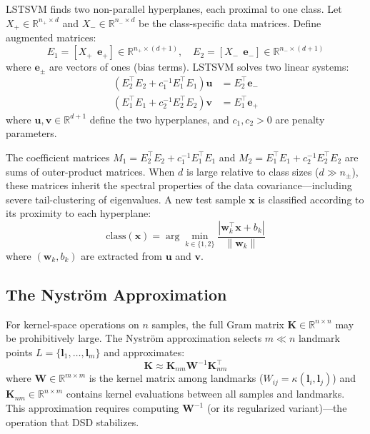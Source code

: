 \documentclass[journal]{IEEEtran}
\begin{document}
LSTSVM \cite{kumar2009lstsvm} finds two non-parallel hyperplanes, each proximal to one class. Let $X_+ \in \mathbb{R}^{n_+ \times d}$ and $X_- \in \mathbb{R}^{n_- \times d}$ be the class-specific data matrices. Define augmented matrices:
\begin{equation}
E_1 = [X_+ ~~ \bm{e}_+] \in \mathbb{R}^{n_+ \times (d+1)}, \quad E_2 = [X_- ~~ \bm{e}_-] \in \mathbb{R}^{n_- \times (d+1)}
\end{equation}
where $\bm{e}_\pm$ are vectors of ones (bias terms). LSTSVM solves two linear systems:
\begin{align}
(E_2^\top E_2 + c_1^{-1} E_1^\top E_1) \bm{u} &= E_2^\top \bm{e}_- \label{eq:lstsvm_u} \\
(E_1^\top E_1 + c_2^{-1} E_2^\top E_2) \bm{v} &= E_1^\top \bm{e}_+ \label{eq:lstsvm_v}
\end{align}
where $\bm{u}, \bm{v} \in \mathbb{R}^{d+1}$ define the two hyperplanes, and $c_1, c_2 > 0$ are penalty parameters.

The coefficient matrices $M_1 = E_2^\top E_2 + c_1^{-1} E_1^\top E_1$ and $M_2 = E_1^\top E_1 + c_2^{-1} E_2^\top E_2$ are sums of outer-product matrices. When $d$ is large relative to class sizes ($d \gg n_\pm$), these matrices inherit the spectral properties of the data covariance---including severe tail-clustering of eigenvalues. A new test sample $\bm{x}$ is classified according to its proximity to each hyperplane:
\begin{equation}
\text{class}(\bm{x}) = \arg\min_{k \in \{1,2\}} \frac{|\bm{w}_k^\top \bm{x} + b_k|}{\|\bm{w}_k\|}
\end{equation}
where $(\bm{w}_k, b_k)$ are extracted from $\bm{u}$ and $\bm{v}$.

\subsection{The Nystr\"{o}m Approximation}

For kernel-space operations on $n$ samples, the full Gram matrix $\bm{K} \in \mathbb{R}^{n \times n}$ may be prohibitively large. The Nystr\"{o}m approximation \cite{williams2001nystrom} selects $m \ll n$ landmark points $L = \{\bm{l}_1, \ldots, \bm{l}_m\}$ and approximates:
\begin{equation}
\bm{K} \approx \bm{K}_{nm} \bm{W}^{-1} \bm{K}_{nm}^\top
\label{eq:nystrom}
\end{equation}
where $\bm{W} \in \mathbb{R}^{m \times m}$ is the kernel matrix among landmarks ($W_{ij} = \kappa(\bm{l}_i, \bm{l}_j)$) and $\bm{K}_{nm} \in \mathbb{R}^{n \times m}$ contains kernel evaluations between all samples and landmarks. This approximation requires computing $\bm{W}^{-1}$ (or its regularized variant)---the operation that DSD stabilizes.
\end{document}
